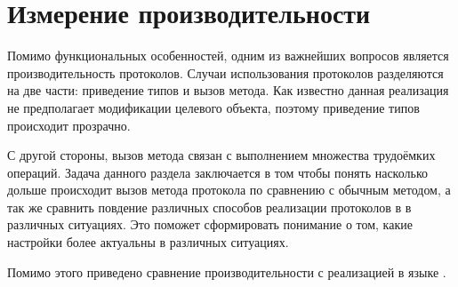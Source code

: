 \section{Измерение производительности} \label{measurements}
Помимо функциональных особенностей, одним из важнейших вопросов является производительность протоколов. Случаи использования протоколов разделяются на две части: приведение типов и вызов метода. Как известно данная реализация не предполагает модификации целевого объекта, поэтому приведение типов происходит прозрачно.

С другой стороны, вызов метода связан с выполнением множества трудоёмких операций. Задача данного раздела заключается в том чтобы понять насколько дольше происходит вызов метода протокола по сравнению с обычным методом, а так же сравнить повдение различных способов реализации протоколов в  в различных ситуациях. Это поможет сформировать понимание о том, какие настройки более актуальны в различных ситуациях.

Помимо этого приведено сравнение производительности с реализацией в языке .



